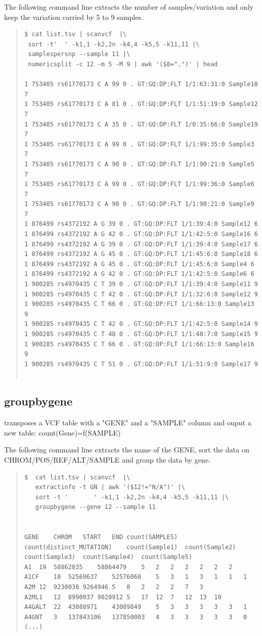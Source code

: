 \documentclass[12pt]{article}
\begin{document}
The following command line extracts the number of samples/variation and only keep the variation carried by 5 to 9 samples.
\begin{quote}
\begin{verbatim}
$ cat list.tsv | scanvcf  |\
 sort -t'  ' -k1,1 -k2,2n -k4,4 -k5,5 -k11,11 |\
 samplespersnp --sample 11 |\
 numericsplit -c 12 -m 5 -M 9 | awk '($8=".")' | head

1 753405 rs61770173 C A 99 0 . GT:GQ:DP:FLT 1/1:63:31:0 Sample10 7
1 753405 rs61770173 C A 81 0 . GT:GQ:DP:FLT 1/1:51:19:0 Sample12 7
1 753405 rs61770173 C A 35 0 . GT:GQ:DP:FLT 1/0:35:66:0 Sample19 7
1 753405 rs61770173 C A 99 0 . GT:GQ:DP:FLT 1/1:99:35:0 Sample3 7
1 753405 rs61770173 C A 90 0 . GT:GQ:DP:FLT 1/1:90:21:0 Sample5 7
1 753405 rs61770173 C A 99 0 . GT:GQ:DP:FLT 1/1:99:36:0 Sample6 7
1 753405 rs61770173 C A 90 0 . GT:GQ:DP:FLT 1/1:90:21:0 Sample9 7
1 876499 rs4372192 A G 39 0 . GT:GQ:DP:FLT 1/1:39:4:0 Sample12 6
1 876499 rs4372192 A G 42 0 . GT:GQ:DP:FLT 1/1:42:5:0 Sample16 6
1 876499 rs4372192 A G 39 0 . GT:GQ:DP:FLT 1/1:39:4:0 Sample17 6
1 876499 rs4372192 A G 45 0 . GT:GQ:DP:FLT 1/1:45:6:0 Sample18 6
1 876499 rs4372192 A G 45 0 . GT:GQ:DP:FLT 1/1:45:6:0 Sample4 6
1 876499 rs4372192 A G 42 0 . GT:GQ:DP:FLT 1/1:42:5:0 Sample6 6
1 900285 rs4970435 C T 39 0 . GT:GQ:DP:FLT 1/1:39:4:0 Sample11 9
1 900285 rs4970435 C T 42 0 . GT:GQ:DP:FLT 1/1:32:6:0 Sample12 9
1 900285 rs4970435 C T 66 0 . GT:GQ:DP:FLT 1/1:66:13:0 Sample13 9
1 900285 rs4970435 C T 42 0 . GT:GQ:DP:FLT 1/1:42:5:0 Sample14 9
1 900285 rs4970435 C T 48 0 . GT:GQ:DP:FLT 1/1:48:7:0 Sample15 9
1 900285 rs4970435 C T 66 0 . GT:GQ:DP:FLT 1/1:66:13:0 Sample16 9
1 900285 rs4970435 C T 51 0 . GT:GQ:DP:FLT 1/1:51:9:0 Sample17 9


\end{verbatim}
\end{quote}

\subsection{groupbygene}
transposes a VCF table with a "GENE" and a "SAMPLE" column and ouput a new table: count(Gene)=f(SAMPLE)

The following command line extracts the name of the GENE, sort the data on CHROM/POS/REF/ALT/SAMPLE and group the data by gene.

\begin{quote}
\begin{verbatim}
$  cat list.tsv | scanvcf  |\
   extractinfo -t GN | awk '($12!="N/A")' |\
   sort -t '       ' -k1,1 -k2,2n -k4,4 -k5,5 -k11,11 |\
   groupbygene --gene 12 --sample 11


GENE	CHROM	START	END	count(SAMPLES)	count(distinct_MUTATION)	count(Sample1)	count(Sample2)	count(Sample3)	count(Sample4)	count(Sample5)
A1	19	58862835	58864479	5	2	2	2	2	2	2
A1CF	10	52569637	52576068	5	3	1	3	1	1	1
A2M	12	9230038	9264946	5	8	2	2	2	7	3
A2ML1	12	8990937	9020912	5	17	12	7	12	13	10
A4GALT	22	43088971	43089849	5	3	3	3	3	3	1
A4GNT	3	137843106	137850003	4	3	3	3	3	3	0
(...)
\end{verbatim}
\end{quote}
\end{document}
